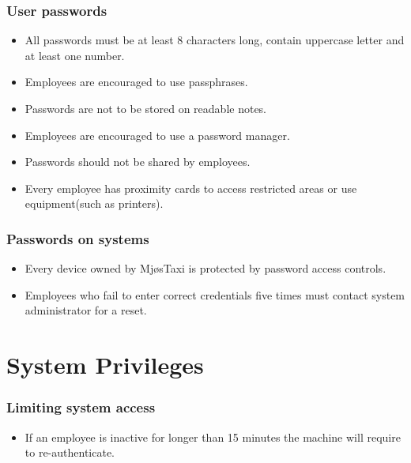 \subsubsection*{User passwords} 
\vspace{-0.6em}
    \begin{itemize}[noitemsep]  %
        \item All passwords must be at least 8 characters long, contain uppercase letter and at least one number.
        \item Employees are encouraged to use passphrases.
        \item Passwords are not to be stored on readable notes.
        \item Employees are encouraged to use a password manager.
        \item Passwords should not be shared by employees.
        \item Every employee has proximity cards to access restricted areas or use equipment(such as printers).
    \end{itemize}{} 

\subsubsection*{Passwords on systems}
\vspace{-0.6em}
    \begin{itemize}[noitemsep]
        \item Every device owned by MjøsTaxi is protected by password access controls.
        \item Employees who fail to enter correct credentials five times must contact system administrator for a reset.
    \end{itemize}{}
    
\section{System Privileges}
\subsubsection*{Limiting system access}
\vspace{-0.6em}
    \begin{itemize}[noitemsep]
        \item If an employee is inactive for longer than 15 minutes the machine will require to re-authenticate.
    \end{itemize}
